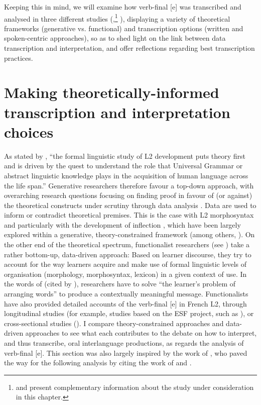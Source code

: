 \documentclass[output=paper,colorlinks,citecolor=brown,modfonts,nonflat]{../langscibook}
\begin{document}
Keeping this in mind, we will examine how verb-final [e] was transcribed and analysed in three different studies (\citealt{Herschensohn2001,Prévost2007English,Prévost2007French},\footnote{{\citet{Prévost2007English} and \citet{Prévost2007French} present complementary information about the study under consideration in this chapter.}} \citealt{Granget2015}), displaying a variety of theoretical frameworks (generative vs. functional) and transcription options (written and spoken-centric approaches), so as to shed light on the link between data transcription and interpretation, and offer reflections regarding best transcription practices.

\section{\textbf{Making theoretically-informed transcription and interpretation choices}}%

As stated by \citet[186]{Ortega2014trying}, “the formal linguistic study of L2 development puts theory first and is driven by the quest to understand the role that Universal Grammar or abstract linguistic knowledge plays in the acquisition of human language across the life span.” Generative researchers therefore favour a top-down approach, with overarching research questions focusing on finding proof in favour of (or against) the theoretical constructs under scrutiny through data analysis \citep{Lardiere2012}. Data are used to inform or contradict theoretical premises. This is the case with L2 morphosyntax and particularly with the development of inflection \citep{Herschensohn2001}, which have been largely explored within a generative, theory-constrained framework (among others, \citealt{PrévostWhite2000,Prévost2007English,Herschensohn2001,Hawkins2004}). On the other end of the theoretical spectrum, functionalist researchers (see \citealt{LenartPerdue2004}) take a rather bottom-up, data-driven approach: Based on learner discourse, they try to account for the way learners acquire and make use of formal linguistic levels of organisation (morphology, morphosyntax, lexicon) in a given context of use. In the words of \citet{KleinPerdue1989} (cited by \citealt[85]{LenartPerdue2004}), researchers have to solve “the learner’s problem of arranging words” to produce a contextually meaningful message. Functionalists have also provided detailed accounts of the verb-final [e] in French L2, through longitudinal studies (for example, studies based on the ESF project, such as \citealt{ColetteEtAl1995,Véronique2004}), or cross-sectional studies (\citealt{BartningSchlyter2004,Granget2015}). I compare theory-constrained approaches and data-driven approaches to see what each contributes to the debate on how to interpret, and thus transcribe, oral interlanguage productions, as regards the analysis of verb-final [e]. This section was also largely inspired by the work of \citet{Granget2015}, who paved the way for the following analysis by citing the work of \citet{Herschensohn2001} and \citet{Prévost2007French}.
\end{document}
